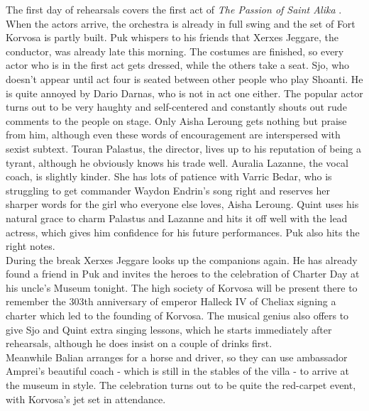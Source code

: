 The first day of rehearsals covers the first act of {\itshape The Passion of Saint Alika} . When the actors arrive, the orchestra is already in full swing and the set of Fort Korvosa is partly built. Puk whispers to his friends that Xerxes Jeggare, the conductor, was already late this morning. The costumes are finished, so every actor who is in the first act gets dressed, while the others take a seat. Sjo, who doesn't appear until act four is seated between other people who play Shoanti. He is quite annoyed by Dario Darnas, who is not in act one either. The popular actor turns out to be very haughty and self-centered and constantly shouts out rude comments to the people on stage. Only Aisha Leroung gets nothing but praise from him, although even these words of encouragement are interspersed with sexist subtext. Touran Palastus, the director, lives up to his reputation of being a tyrant, although he obviously knows his trade well. Auralia Lazanne, the vocal coach, is slightly kinder. She has lots of patience with Varric Bedar, who is struggling to get commander Waydon Endrin's song right and reserves her sharper words for the girl who everyone else loves, Aisha Leroung. Quint uses his natural grace to charm Palastus and Lazanne and hits it off well with the lead actress, which gives him confidence for his future performances. Puk also hits the right notes.\\

During the break Xerxes Jeggare looks up the companions again. He has already found a friend in Puk and invites the heroes to the celebration of Charter Day at his uncle's Museum tonight. The high society of Korvosa will be present there to remember the 303th anniversary of emperor Halleck IV of Cheliax signing a charter which led to the founding of Korvosa. The musical genius also offers to give Sjo and Quint extra singing lessons, which he starts immediately after rehearsals, although he does insist on a couple of drinks first.\\

Meanwhile Balian arranges for a horse and driver, so they can use ambassador Amprei's beautiful coach - which is still in the stables of the villa - to arrive at the museum in style. The celebration turns out to be quite the red-carpet event, with Korvosa's jet set in attendance.\\

